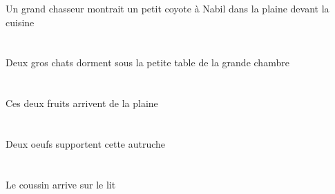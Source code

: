 \begin{exe}
Un grand chasseur montrait un petit coyote à Nabil dans la plaine devant la cuisine
\ex\glll
\INDDuAbs{}   \grosDDu{}   \chatDDuAbs{}    \DEFSgObl{}    \DEFSgObl{}   \grandBSg{}   \chambreBSgObl{}   \DE{}   \petitDSg{}   \tableDSgObl{}   \SOUS{}  \dormirViPrsDDu{}\\
\INDDuAbsP{}   \grosDDuP{}   \chatDDuAbsP{}    \DEFSgOblP{}    \DEFSgOblP{}   \grandBSgP{}   \chambreBSgOblP{}   \DEP{}   \petitDSgP{}   \tableDSgOblP{}   \SOUSP{}  \dormirViPrsDDuP{}\\
\INDDuAbsG{}   \grosDDuG{}   \chatDDuAbsG{}    \DEFSgOblG{}    \DEFSgOblG{}   \grandBSgG{}   \chambreBSgOblG{}   \DEG{}   \petitDSgG{}   \tableDSgOblG{}   \SOUSG{}  \dormirViPrsDDuG{}\\
Deux gros chats dorment sous la petite table de la grande chambre
\ex\glll
\DEMDuAbs{}   \fruitADuAbs{}    \DEFSgObl{}   \plaineASgObl{}   \DE{}  \arriverViPrsADu{}\\
\DEMDuAbsP{}   \fruitADuAbsP{}    \DEFSgOblP{}   \plaineASgOblP{}   \DEP{}  \arriverViPrsADuP{}\\
\DEMDuAbsG{}   \fruitADuAbsG{}    \DEFSgOblG{}   \plaineASgOblG{}   \DEG{}  \arriverViPrsADuG{}\\
Ces deux fruits arrivent de la plaine
\ex\glll
\INDDuErg{}   \oeufCDuErg{}   \DEMSgAbs{}   \autrucheBSgAbs{}  \supporterVtPrsBSg{}\\
\INDDuErgP{}   \oeufCDuErgP{}   \DEMSgAbsP{}   \autrucheBSgAbsP{}  \supporterVtPrsBSgP{}\\
\INDDuErgG{}   \oeufCDuErgG{}   \DEMSgAbsG{}   \autrucheBSgAbsG{}  \supporterVtPrsBSgG{}\\
Deux oeufs supportent cette autruche
\ex\glll
\DEFSgAbs{}   \coussinBSgAbs{}    \DEFSgObl{}   \litDSgObl{}   \SUR{}  \arriverViPrsBSg{}\\
\DEFSgAbsP{}   \coussinBSgAbsP{}    \DEFSgOblP{}   \litDSgOblP{}   \SURP{}  \arriverViPrsBSgP{}\\
\DEFSgAbsG{}   \coussinBSgAbsG{}    \DEFSgOblG{}   \litDSgOblG{}   \SURG{}  \arriverViPrsBSgG{}\\
Le coussin arrive sur le lit
\ex\glll
\INDSgErg{}   \petitBSg{}   \blancBSg{}   \autrucheBSgErg{}    \DEFSgObl{}   \maisonDSgObl{}   \DEVANT{}   \INDSgAbs{}   \noirBSg{}   \theBSgAbs{}  \boireVtPrsBSg{}\\
\INDSgErgP{}   \petitBSgP{}   \blancBSgP{}   \autrucheBSgErgP{}    \DEFSgOblP{}   \maisonDSgOblP{}   \DEVANTP{}   \INDSgAbsP{}   \noirBSgP{}   \theBSgAbsP{}  \boireVtPrsBSgP{}\\
\INDSgErgG{}   \petitBSgG{}   \blancBSgG{}   \autrucheBSgErgG{}    \DEFSgOblG{}   \maisonDSgOblG{}   \DEVANTG{}   \INDSgAbsG{}   \noirBSgG{}   \theBSgAbsG{}  \boireVtPrsBSgG{}\\

\end{exe}
